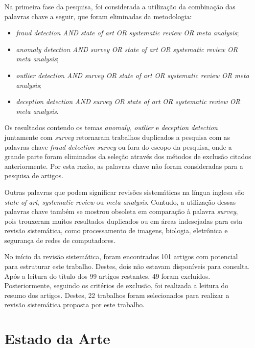 \documentclass[smallextended]{svjour3}
\begin{document}
Na primeira fase da pesquisa, foi considerada a utilização da combinação das palavras chave a seguir, que foram eliminadas da metodologia:

\begin{itemize}
	\item \emph{fraud detection AND state of art OR systematic review OR meta analysis};
	
	\item \emph{anomaly detection AND survey OR state of art OR systematic review OR meta analysis};
	
	\item \emph{outlier detection AND survey OR state of art OR systematic review OR meta analysis}; 	
	
	\item \emph{deception detection AND survey OR state of art OR systematic review OR meta analysis}.
\end{itemize}

Os resultados contendo os temas \emph{anomaly, outlier} e \emph{deception detection} juntamente com \emph{survey} retornaram trabalhos duplicados a pesquisa com as palavras chave \emph{fraud detection survey} ou fora do escopo da pesquisa, onde a grande parte foram eliminados da seleção através dos métodos de exclusão citados anteriormente. Por esta razão, as palavras chave não foram consideradas para a pesquisa de artigos.

Outras palavras que podem significar revisões sistemáticas na língua inglesa são \emph{state of art, systematic review} ou \emph{meta analysis}. Contudo, a utilização dessas palavras chave também se mostrou obsoleta em comparação à palavra \emph{survey}, pois trouxeram muitos resultados duplicados ou em áreas indesejadas para esta revisão sistemática, como processamento de imagens, biologia, eletrônica e segurança de redes de computadores.

No início da revisão sistemática, foram encontrados 101 artigos com potencial para estruturar este trabalho. Destes, dois não estavam disponíveis para consulta. Após a leitura do título dos 99 artigos restantes, 49 foram excluídos. Posteriormente, seguindo os critérios de exclusão, foi realizada a leitura do resumo dos artigos. Destes, 22 trabalhos foram selecionados para realizar a revisão sistemática proposta por este trabalho.

\section{Estado da Arte}
\label{sec:4}
\end{document}
